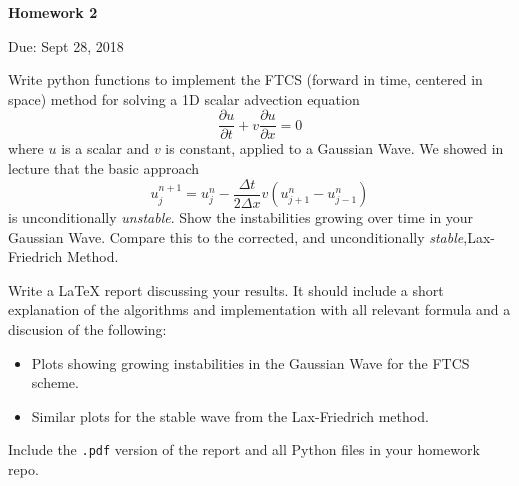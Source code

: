 \documentclass{article}
\begin{document}
\begin{center}

\vspace*{-2.5cm}
\LARGE
\bf{Homework 2}
\vspace{1cm}

\large{Due: Sept 28, 2018}
\vspace{1cm}

\end{center}

Write python functions to implement the FTCS (forward in time, centered in space) method for solving a 1D scalar advection equation
\begin{equation*}
   \frac{\partial u}{\partial t} + v \frac{\partial u}{\partial x} = 0
\end{equation*}
where $u$ is a scalar and $v$ is constant, applied to a Gaussian Wave. We showed in lecture that the basic approach
\begin{equation*}
   u_j^{n+1} = u^n_j - \frac{\Delta t}{2\Delta x}v \left( u^n_{j+1} - u^n_{j-1} \right) 
\end{equation*}
is unconditionally \emph{unstable}.  Show the instabilities growing over time in your Gaussian Wave.  Compare this to the corrected, and unconditionally \emph{stable},Lax-Friedrich Method.
\par
Write a \LaTeX{} report discussing your results.  It should include a short explanation of the algorithms and implementation with all relevant formula and a discusion of the following:
\begin{itemize}
   \item Plots showing growing instabilities in the Gaussian Wave for the FTCS scheme.
   \item Similar plots for the stable wave from the Lax-Friedrich method.
\end{itemize}
Include the \texttt{.pdf} version of the report and all Python files in your homework repo.
\end{document}
